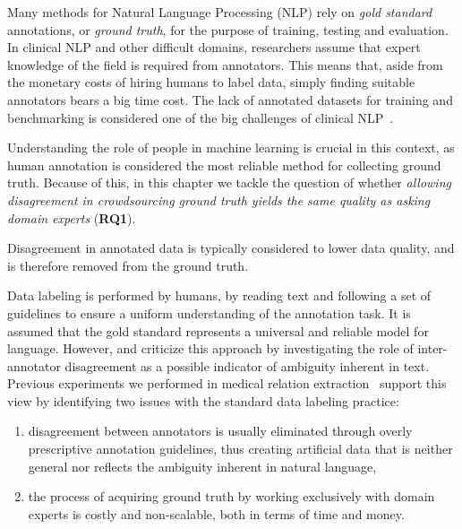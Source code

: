 
Many methods for Natural Language Processing (NLP) rely on \textit{gold standard} annotations, or \textit{ground truth}, for the purpose of training, testing and evaluation. In clinical NLP and other difficult domains, researchers assume that expert knowledge of the field is required from annotators.  This means that, aside from the monetary costs of hiring humans to label data, simply finding suitable annotators bears a big time cost. The lack of annotated datasets for training and benchmarking is considered one of the big challenges of clinical NLP~\cite{chapman2011overcoming}. {\color{blue} Understanding the role of people in machine learning is crucial in this context, as human annotation is considered the most reliable method for collecting ground truth. Because of this, in this chapter we tackle the question of whether \textit{allowing disagreement in crowdsourcing ground truth yields the same quality as asking domain experts} (\textbf{RQ1}).

Disagreement in annotated data is typically considered to lower data quality, and is therefore removed from the ground truth.} Data labeling is performed by humans, by reading text and following a set of guidelines to ensure a uniform understanding of the annotation task.  It is assumed that the gold standard represents a universal and reliable model for language. However, \citet{schaekermann2016} and \citet{Bayerl2011} criticize this approach by investigating the role of inter-annotator disagreement as a possible indicator of ambiguity inherent in text.  Previous experiments we performed in medical relation extraction~\cite{aroyo2013crowd} support this view by identifying two issues with the standard data labeling practice:

\begin{enumerate}

\item disagreement between annotators is usually eliminated through overly prescriptive annotation guidelines, thus creating artificial data that is neither general nor reflects the ambiguity inherent in natural language,

\item the process of acquiring ground truth by working exclusively with domain experts is costly and non-scalable, both in terms of time and money.

\end{enumerate}

